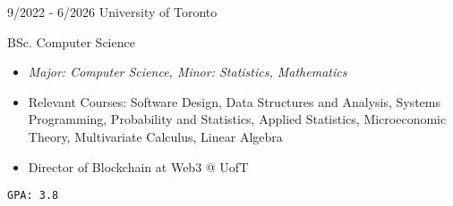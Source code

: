 \documentclass[9pt]{developercv} %
\begin{document}
\vspace{-10 pt}
\begin{entrylist}
    \entry
		{9/2022 - 6/2026}
		{University of Toronto}
		{}
		{BSc. Computer Science
        \vspace{5pt}
        \begin{itemize}[itemsep=3pt,topsep=0pt,parsep=0pt,partopsep=0pt, leftmargin=-1pt]
            \item \textit{Major: Computer Science, Minor: Statistics, Mathematics}
            \item Relevant Courses: Software Design, Data Structures and Analysis, Systems Programming, Probability and Statistics, Applied Statistics, Microeconomic Theory, Multivariate Calculus, Linear Algebra
            \item Director of Blockchain at Web3 @ UofT
        \end{itemize}
        \vspace{5pt}
        \texttt{GPA: 3.8}
        }
\end{entrylist}
\end{document}
